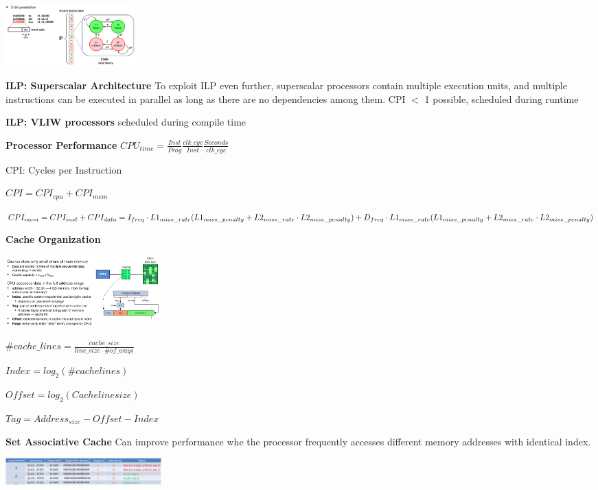 \documentclass[english]{latex4ei/latex4ei_sheet}
\begin{document}
\begin{center}
	\includegraphics[width = 5cm]{images/4.ProcessorArchitecture/2BitPred.png}
\end{center}



\textbf{ILP: Superscalar Architecture} To exploit ILP even further, superscalar processors contain multiple execution units, and multiple instructions can be executed in parallel as long as there are no dependencies among them. CPI $<$ 1 possible, scheduled during runtime

\textbf{ILP: VLIW processors} scheduled during compile time

\textbf{Processor Performance} $CPU_{time} = \frac{Inst}{Prog} \frac{clk\_cyc}{Inst} \frac{Seconds}{clk\_cyc}$

CPI: Cycles per Instruction

$CPI = CPI_{cpu} + CPI_{mem}$

$CPI_{mem} = CPI_{inst} + CPI_{data}
	\newline = I_{freq} \cdot L1_{miss\_rate} (L1_{miss\_penalty} + L2_{miss\_rate} \cdot L2_{miss\_penalty}) + D_{freq} \cdot L1_{miss\_rate} (L1_{miss\_penalty} + L2_{miss\_rate} \cdot L2_{miss\_penalty})$

\textbf{Cache Organization}

\begin{center}
	\includegraphics[width = 6cm]{images/4.ProcessorArchitecture/cache.png}
\end{center}

$\#cache\_lines = \frac{cache\_size}{line\_size \cdot \#of\_ways}$

$Index = log_2(\#cache lines)$

$Offset = log_2(Cache line size)$

$Tag = Address_{size} - Offset - Index$

\textbf{Set Associative Cache}
Can improve performance whe the processor frequently accesses different memory addresses with identical index.
\begin{center}
	\includegraphics[width = 6cm]{images/4.ProcessorArchitecture/SetAcCache.png}
\end{center}
\end{document}
